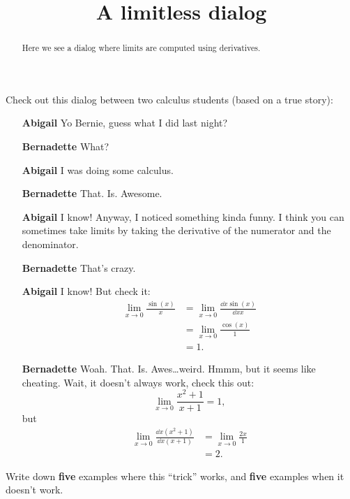 \documentclass{ximera}
\title[Break-Ground:]{A limitless dialog}
\begin{document}
\begin{abstract}
Here we see a dialog where limits are computed using derivatives.
\end{abstract}
\maketitle

Check out this dialog between two calculus students (based on a true
story):

\begin{itemize}
\item[\textbf{Abigail}] Yo Bernie, guess what I did last night?
\item[\textbf{Bernadette}] What?
\item[\textbf{Abigail}] I was doing some calculus.
\item[\textbf{Bernadette}] That. Is. Awesome.
\item[\textbf{Abigail}] I know! Anyway, I noticed something kinda funny. I
  think you can sometimes take limits by taking the derivative of the
  numerator and the denominator.
\item[\textbf{Bernadette}] That's crazy.
\item[\textbf{Abigail}] I know! But check it:
  \begin{align*}
    \lim_{x\to 0} \frac{\sin(x)}{x} &= \lim_{x\to 0} \frac{\dd{x}\sin(x)}{\dd{x}x}\\
    &= \lim_{x\to 0} \frac{\cos(x)}{1}\\
    &=1.
  \end{align*}
  \item[\textbf{Bernadette}] Woah. That. Is. Awes\dots weird. Hmmm, but it seems like
    cheating. Wait, it doesn't always work, check this out:
    \[
    \lim_{x\to 0} \frac{x^2+1}{x+1} = 1,
    \]
    but
    \begin{align*}
      \lim_{x\to 0} \frac{\dd{x}\left(x^2+1\right)}{\dd{x}\left(x+1\right)} &=
      \lim_{x\to 0} \frac{2x}{1} \\
      &=2.
    \end{align*}
\end{itemize}

\begin{problem}
  Write down \textbf{five} examples where this ``trick'' works, and
  \textbf{five} examples when it doesn't work.
  \begin{freeResponse}
\end{freeResponse}
\end{problem}
\end{document}
